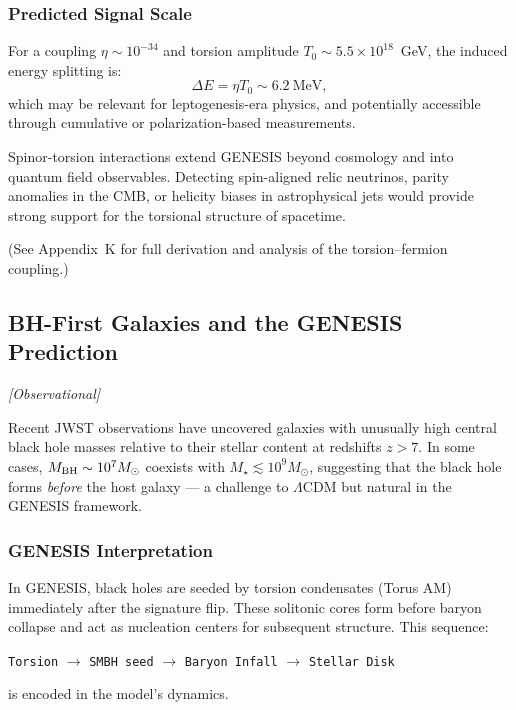 \documentclass{article}
\newcommand{\obstag}{\textcolor{green!60!black}{\textit{[Observational]}}}
\begin{document}
\subsubsection*{Predicted Signal Scale}
For a coupling $\eta \sim 10^{-34}$ and torsion amplitude $T_0 \sim 5.5 \times 10^{18}$~GeV, the induced energy splitting is:
\begin{equation}
\Delta E = \eta T_0 \sim 6.2~\text{MeV},
\end{equation}
which may be relevant for leptogenesis-era physics, and potentially accessible through cumulative or polarization-based measurements.

\begin{tcolorbox}[colback=gray!5, colframe=black!30, title=Why this matters]
Spinor-torsion interactions extend GENESIS beyond cosmology and into quantum field observables. Detecting spin-aligned relic neutrinos, parity anomalies in the CMB, or helicity biases in astrophysical jets would provide strong support for the torsional structure of spacetime.
\end{tcolorbox}

(See Appendix~K for full derivation and analysis of the torsion–fermion coupling.)


\subsection{ BH-First Galaxies and the GENESIS Prediction}
\label{sec:bh_first}
\obstag


Recent JWST observations have uncovered galaxies with unusually high central black hole masses relative to their stellar content at redshifts $z > 7$. In some cases, $M_{\rm BH} \sim 10^7 M_\odot$ coexists with $M_\star \lesssim 10^9 M_\odot$, suggesting that the black hole forms \emph{before} the host galaxy --- a challenge to $\Lambda$CDM but natural in the GENESIS framework.

\subsubsection*{GENESIS Interpretation}
In GENESIS, black holes are seeded by torsion condensates (Torus AM) immediately after the signature flip. These solitonic cores form before baryon collapse and act as nucleation centers for subsequent structure. This sequence:
\begin{center}
\texttt{Torsion} $\rightarrow$ \texttt{SMBH seed} $\rightarrow$ \texttt{Baryon Infall} $\rightarrow$ \texttt{Stellar Disk}
\end{center}
is encoded in the model's dynamics.
\end{document}
